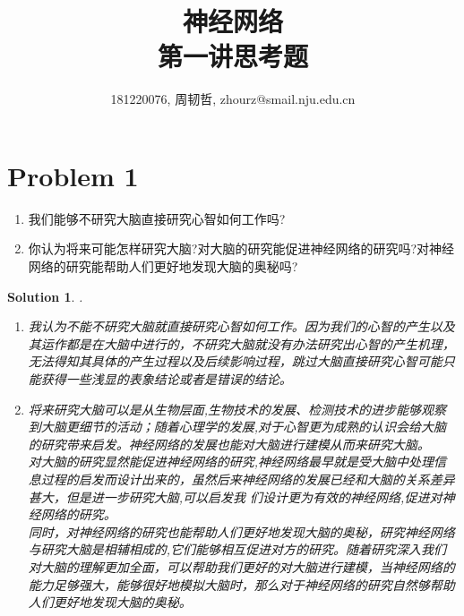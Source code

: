 \documentclass[a4paper,UTF8]{article}
\numberwithin{equation}{section}
\newtheorem*{solution}{Solution}
\begin{document}
\title{神经网络\\
第一讲思考题}
\author{181220076, 周韧哲, zhourz@smail.nju.edu.cn}
\maketitle

\section*{Problem 1}\begin{enumerate}
	\item 我们能够不研究大脑直接研究心智如何工作吗?
	\item 你认为将来可能怎样研究大脑?对大脑的研究能促进神经网络的研究吗?对神经网络的研究能帮助人们更好地发现大脑的奥秘吗?
\end{enumerate}
\begin{solution}.\begin{enumerate}
		\item 我认为不能不研究大脑就直接研究心智如何工作。因为我们的心智的产生以及其运作都是在大脑中进行的，不研究大脑就没有办法研究出心智的产生机理，无法得知其具体的产生过程以及后续影响过程，跳过大脑直接研究心智可能只能获得一些浅显的表象结论或者是错误的结论。
		\item 将来研究大脑可以是从生物层面,生物技术的发展、检测技术的进步能够观察到大脑更细节的活动；随着心理学的发展,对于心智更为成熟的认识会给大脑的研究带来启发。神经网络的发展也能对大脑进行建模从而来研究大脑。\\
		对大脑的研究显然能促进神经网络的研究,神经网络最早就是受大脑中处理信息过程的启发而设计出来的，虽然后来神经网络的发展已经和大脑的关系差异甚大，但是进一步研究大脑,可以启发我
		们设计更为有效的神经网络,促进对神经网络的研究。\\
		同时，对神经网络的研究也能帮助人们更好地发现大脑的奥秘，研究神经网络与研究大脑是相辅相成的,它们能够相互促进对方的研究。随着研究深入我们对大脑的理解更加全面，可以帮助我们更好的对大脑进行建模，当神经网络的能力足够强大，能够很好地模拟大脑时，那么对于神经网络的研究自然够帮助人们更好地发现大脑的奥秘。
		
		
		
		
	\end{enumerate}
\end{solution}
\end{document}
